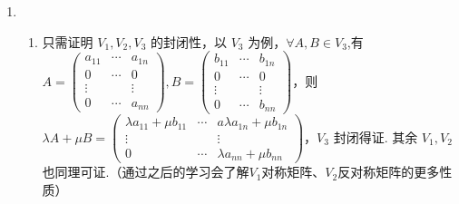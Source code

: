 \begin{enumerate}
    \item \begin{enumerate}
              \item 只需证明 $V_1,V_2,V_3$ 的封闭性，以 $V_3$ 为例，$\forall A,B\in V_3$,有 $A=\begin{pmatrix}
                            a_{11} & \cdots & a_{1n} \\
                            0      & \cdots & 0      \\
                            \vdots &        & \vdots \\
                            0      & \cdots & a_{nn}
                        \end{pmatrix},B=\begin{pmatrix}
                            b_{11} & \cdots & b_{1n} \\
                            0      & \cdots & 0      \\
                            \vdots &        & \vdots \\
                            0      & \cdots & b_{nn}
                        \end{pmatrix}$，则 $\lambda A+\mu B=\begin{pmatrix}
                            \lambda a_{11}+\mu b_{11} & \cdots & a\lambda a_{1n}+\mu b_{1n} \\
                            \vdots                    &        & \vdots                     \\
                            0                         & \cdots & \lambda a_{nn}+\mu b_{nn}
                        \end{pmatrix}$，$V_3$ 封闭得证. 其余 $V_1,V_2$ 也同理可证.（通过之后的学习会了解$V_1$对称矩阵、$V_2$反对称矩阵的更多性质）


\end{enumerate}
\end{enumerate}
